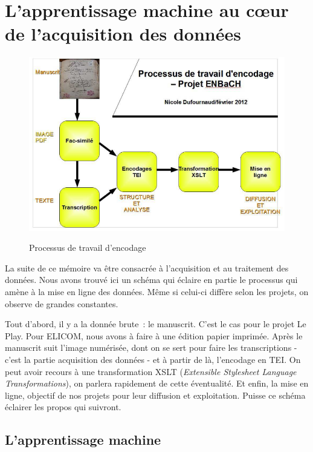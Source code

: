 \part{L'apprentissage machine au c\oe ur de l'acquisition des données}

\begin{figure}[ht]
    \centering
    \caption{Processus de travail d'encodage}
    \includegraphics[width=16cm]{images/processus_encodage.png}
    \label{processus_encodage}
\end{figure}

La suite de ce mémoire va être consacrée à l'acquisition et au traitement des données. Nous avons trouvé ici un schéma qui éclaire en partie le processus qui amène à la mise en ligne des données. Même si celui-ci diffère selon les projets, on observe de grandes constantes.

Tout d'abord, il y a la donnée brute~: le manuscrit. C'est le cas pour le projet Le Play. Pour ELICOM, nous avons à faire à une édition papier imprimée. Après le manuscrit suit l'image numérisée, dont on se sert pour faire les transcriptions - c'est la partie acquisition des données - et à partir de là, l'encodage en TEI. On peut avoir recours à une transformation XSLT (\emph{Extensible Stylesheet Language Transformations}), on parlera rapidement de cette éventualité. Et enfin, la mise en ligne, objectif de nos projets pour leur diffusion et exploitation. Puisse ce schéma éclairer les propos qui suivront. 

\chapter{L'apprentissage machine}

